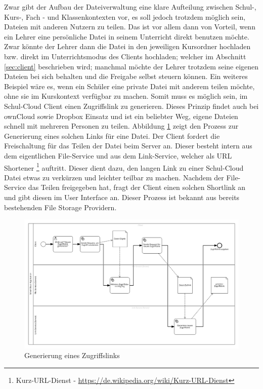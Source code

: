 Zwar gibt der Aufbau der Dateiverwaltung eine klare Aufteilung zwischen Schul-, Kurs-, Fach - und Klassenkontexten vor, es soll jedoch trotzdem möglich sein, Dateien mit anderen Nutzern zu teilen. Das ist vor allem dann von Vorteil, wenn ein Lehrer eine persönliche Datei in seinem Unterricht direkt benutzen möchte. Zwar könnte der Lehrer dann die Datei in den jeweiligen Kursordner hochladen bzw. direkt im Unterrichtsmodus des Clients hochladen; welcher im Abschnitt \ref{sec:client} beschrieben wird; manchmal möchte der Lehrer trotzdem seine eigenen Dateien bei sich behalten und die Freigabe selbst steuern können. Ein weiteres Beispiel wäre es, wenn ein Schüler eine private Datei mit anderem teilen möchte, ohne sie im Kurskontext verfügbar zu machen. Somit muss es möglich sein, im Schul-Cloud Client einen Zugriffslink zu generieren. Dieses Prinzip findet auch bei ownCloud sowie Dropbox Einsatz und ist ein beliebter Weg, eigene Dateien schnell mit mehreren Personen zu  teilen. Abbildung \ref{fig:filesharinggeneration} zeigt den Prozess zur Generierung eines solchen Links für eine Datei. Der Client fordert die Freischaltung für das Teilen der Datei beim Server an. Dieser besteht intern aus dem eigentlichen File-Service und aus dem Link-Service, welcher als URL  Shortener \footnote{Kurz-URL-Dienst - \url{https://de.wikipedia.org/wiki/Kurz-URL-Dienst}} auftritt. Dieser dient dazu, den langen Link zu einer Schul-Cloud Datei etwas zu verkürzen und leichter teilbar zu machen. Nachdem der File-Service das Teilen freigegeben hat, fragt der Client einen solchen Shortlink an und gibt diesen im User Interface an. Dieser Prozess ist bekannt aus bereits bestehenden File Storage Providern.

\begin{figure}[H]
	\includegraphics[width=1\linewidth]{images/filesharinggeneration}
	\caption[Caption for concept]{Generierung eines Zugriffslinks}
	\centering
	\label{fig:filesharinggeneration}
\end{figure}

